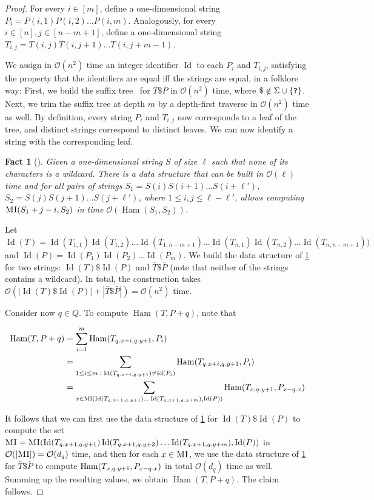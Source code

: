 \documentclass[11pt, letterpaper]{article}
\theoremstyle{plain}
\newtheorem{fact}{Fact}
\theoremstyle{definition}
\theoremstyle{remark}
\renewcommand{\O}{\mathcal{O}}
\DeclareMathOperator*{\Ham}{Ham}
\DeclareMathOperator*{\ID}{Id}
\newcommand{\absolute}[1]{\left\lvert#1\right\rvert}
\begin{document}
\begin{proof}
For every $i \in [m]$, define a one-dimensional string $P_i = P(i,1) P(i,2) \ldots P(i,m)$. Analogously, for every $i \in [n], j \in [n-m+1]$, define a one-dimensional string $T_{i,j} = T(i,j) T(i,j+1) \ldots T(i,j+m-1)$. 

We assign in $\O(n^2)$ time an integer identifier $\ID$ to each $P_i$ and $T_{i,j}$, satisfying the property that the identifiers are equal iff the strings are equal, in a folklore way: First, we build the suffix tree~\cite{DBLP:conf/focs/Weiner73} for $\bar{T} \$ \bar{P}$ in $\O(n^2)$ time, where $\$ \notin \Sigma \cup \{\texttt{?}\}$. Next, we trim the suffix tree at depth $m$ by a depth-first traverse in $\O(n^2)$ time as well. By definition, every string $P_i$ and $T_{i,j}$ now corresponds to a leaf of the tree, and distinct strings correspond to distinct leaves. We can now identify a string with the corresponding leaf. 

\begin{fact}[{\cite{Galil1986}}]\label{fact:kangaroo1D}
Given a one-dimensional string $S$ of size $\ell$ such that none of its characters is a wildcard. There is a data structure that can be built in $\O(\ell)$ time and for all pairs of strings $S_1 = S(i) S(i+1) \ldots S(i+\ell')$, $S_2 = S(j) S(j+1) \ldots S(j+\ell')$, where $1 \le i,j \le \ell-\ell'$, allows computing $\textsc{MI}(S_1+j-i, S_2)$ in time $\O(\Ham(S_1,S_2))$. 
\end{fact}

Let $\ID(T) = \ID(T_{1,1}) \ID(T_{1,2}) \ldots \ID(T_{1,n-m+1}) \ldots \ID(T_{n,1}) \ID(T_{n,2}) \ldots \ID(T_{n,n-m+1}))$ and $\ID(P) = \ID(P_1)\ID(P_2) \ldots \ID(P_m)$. 
We build the data structure of \cref{fact:kangaroo1D} for two strings: $\ID(T) \$ \ID(P)$ and $\bar{T} \$ \bar{P}$ (note that neither of the strings contains a wildcard). In total, the construction takes $\O(\absolute{\ID(T) \$ \ID(P)} + \absolute{\bar{T} \$ \bar{P}}) = \O(n^2)$ time.

Consider now $q \in Q$. To compute $\Ham(T, P+q)$, note that 

\begin{align*}
\Ham(T, P+q) &= \sum_{i=1}^m \Ham(T_{\x{q}+i, \y{q}+1}, P_i)\\
&= \sum_{1 \le i \le m \; : \; \ID(T_{\x{q}+i, \y{q}+1}) \neq \ID(P_i)} \Ham(T_{\x{q}+i, \y{q}+1}, P_i) \\
&= \sum_{x \in \MI(\ID(T_{\x{q}+1, \y{q}+1}) \ldots \ID(T_{\x{q}+1, \y{q}+m}), \ID(P))} \Ham(T_{x, \y{q}+1}, P_{x-\x{q}})\\
\end{align*}

It follows that we can first use the data structure of \cref{fact:kangaroo1D} for  $\ID(T) \$ \ID(P)$ to compute the set $\MI =  \MI(\ID(T_{\x{q}+1, \y{q}+1}) \ID(T_{\x{q}+1, \y{q}+2}) \ldots \ID(T_{\x{q}+1, \y{q}+m}), \ID(P))$ in $\O(\absolute{\MI}) = \O(d_q)$ time, and then for each $x \in \textsc{MI}$, we use the data structure of  \cref{fact:kangaroo1D}  for $\bar{T} \$ \bar{P}$ to compute 
$\Ham(T_{x, \y{q}+1}, P_{x-\x{q}})$ in total $\O(d_q)$ time as well. Summing up the resulting values, we obtain $\Ham(T, P+q)$. The claim follows. 
\end{proof}
\end{document}
